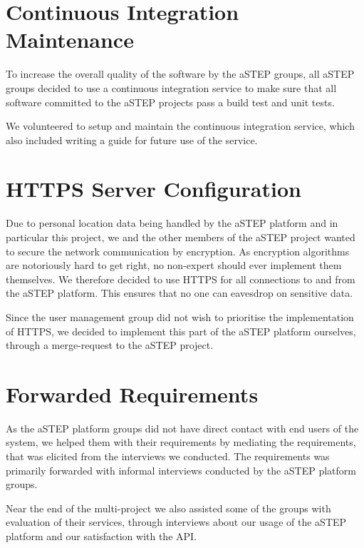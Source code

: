 \section{Continuous Integration Maintenance}
To increase the overall quality of the software by the aSTEP groups, all aSTEP groups decided to use a continuous integration service to make sure that all software committed to the aSTEP projects pass a build test and unit tests.

We volunteered to setup and maintain the continuous integration service, which also included writing a guide for future use of the service.

\section{HTTPS Server Configuration}
Due to personal location data being handled by the aSTEP platform and in particular this project, we and the other members of the aSTEP project wanted to secure the network communication by encryption. As encryption algorithms are notoriously hard to get right, no non-expert should ever implement them themselves. We therefore decided to use HTTPS for all connections to and from the aSTEP platform. This ensures that no one can eavesdrop on sensitive data.

Since the user management group did not wish to prioritise the implementation of HTTPS, we decided to implement this part of the aSTEP platform ourselves, through a merge-request to the aSTEP project.

\section{Forwarded Requirements}

As the aSTEP platform groups did not have direct contact with end users of the system, we helped them with their requirements by mediating the requirements, that was elicited from the interviews we conducted. The requirements was primarily forwarded with informal interviews conducted by the aSTEP platform groups.

Near the end of the multi-project we also assisted some of the groups with evaluation of their services, through interviews about our usage of the aSTEP platform and our satisfaction with the API.








